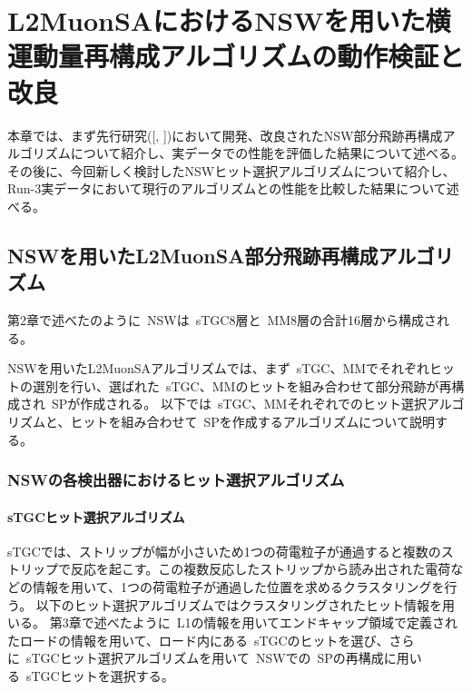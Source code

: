\chapter{L2MuonSAにおけるNSWを用いた横運動量再構成アルゴリズムの動作検証と改良}\label{chapter5}


本章では、まず先行研究([\cite{article:kumaoka}, \cite{article:noguchi}])において開発、改良されたNSW部分飛跡再構成アルゴリズムについて紹介し、実データでの性能を評価した結果について述べる。
その後に、今回新しく検討したNSWヒット選択アルゴリズムについて紹介し、Run-3実データにおいて現行のアルゴリズムとの性能を比較した結果について述べる。

\newpage

\section{NSWを用いたL2MuonSA部分飛跡再構成アルゴリズム}\label{5-1}
第2章で述べたのように~NSWは~sTGC8層と~MM8層の合計16層から構成される。

NSWを用いたL2MuonSAアルゴリズムでは、まず~sTGC、MMでそれぞれヒットの選別を行い、選ばれた~sTGC、MMのヒットを組み合わせて部分飛跡が再構成され~SPが作成される。
以下では~sTGC、MMそれぞれでのヒット選択アルゴリズムと、ヒットを組み合わせて~SPを作成するアルゴリズムについて説明する。

\subsection{NSWの各検出器におけるヒット選択アルゴリズム}\label{5-1-1}
\subsubsection{sTGCヒット選択アルゴリズム}
sTGCでは、ストリップが幅が小さいため1つの荷電粒子が通過すると複数のストリップで反応を起こす。この複数反応したストリップから読み出された電荷などの情報を用いて、1つの荷電粒子が通過した位置を求めるクラスタリングを行う。
以下のヒット選択アルゴリズムではクラスタリングされたヒット情報を用いる。
第3章で述べたように~L1の情報を用いてエンドキャップ領域で定義されたロードの情報を用いて、ロード内にある~sTGCのヒットを選び、さらに~sTGCヒット選択アルゴリズムを用いて~NSWでの~SPの再構成に用いる~sTGCヒットを選択する。

